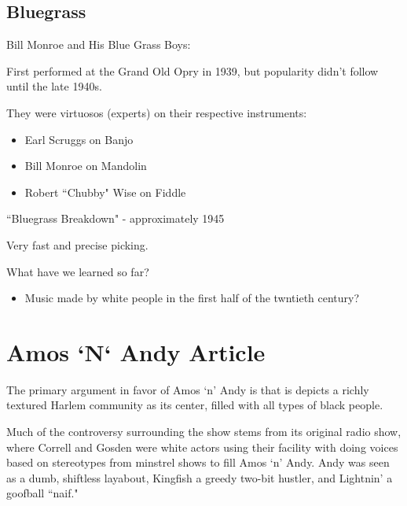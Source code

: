 \documentclass[12pt, a4paper, twoside, openright, titlepage]{book}
\begin{document}
\subsection{Bluegrass}


\begin{eg}{}{}
    Bill Monroe and His Blue Grass Boys: 

    First performed at the Grand Old Opry in 1939, but popularity didn't follow until the late 1940s.

    They were virtuosos (experts) on their respective instruments: \begin{itemize}
        \item Earl Scruggs on Banjo
        \item Bill Monroe on Mandolin
        \item Robert ``Chubby" Wise on Fiddle
    \end{itemize}

\end{eg}

\begin{eg}{}{}
    ``Bluegrass Breakdown" - approximately 1945

    Very fast and precise picking.
\end{eg}

\begin{qst}{}{}
    What have we learned so far?
\end{qst}

\begin{itemize}
    \item Music made by white people in the first half of the twntieth century?
\end{itemize}






\section{Amos `N` Andy Article}

The primary argument in favor of Amos `n' Andy is that is depicts a richly textured Harlem community as its center, filled with all types of black people.

Much of the controversy surrounding the show stems from its original radio show, where Correll and Gosden were white actors using their facility with doing voices based on stereotypes from minstrel shows to fill Amos `n' Andy. Andy was seen as a dumb, shiftless layabout, Kingfish a greedy two-bit hustler, and Lightnin' a goofball ``naif."
\end{document}
